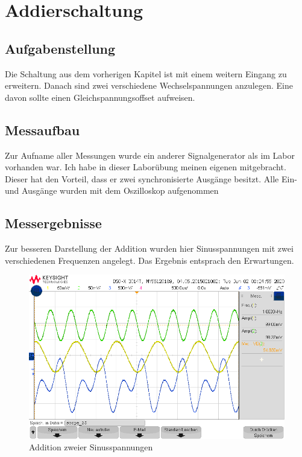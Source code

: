 \section{Addierschaltung}
\subsection{Aufgabenstellung}
Die Schaltung aus dem vorherigen Kapitel ist mit einem weitern Eingang zu erweitern. Danach sind zwei verschiedene Wechselspannungen anzulegen. Eine davon sollte einen Gleichspannungsoffset aufweisen. 


\subsection{Messaufbau}
Zur Aufname aller Messungen wurde ein anderer Signalgenerator als im Labor vorhanden war. Ich habe in dieser Laborübung meinen eigenen mitgebracht. Dieser hat den Vorteil, dass er zwei synchronisierte Ausgänge besitzt. Alle Ein- und Ausgänge wurden mit dem Oszilloskop aufgenommen


\subsection{Messergebnisse}
Zur besseren Darstellung der Addition wurden hier Sinusspannungen mit zwei verschiedenen Frequenzen angelegt. Das Ergebnis entsprach den Erwartungen. 
\begin{figure}[H]
    \centering
    \includegraphics[width=\costumPicWidth]{Lab_1/Messungen/Addierer/scope_25.png}
    \caption{Addition zweier Sinusspannungen}
    \label{fig:Addierschaltung_Ergebnis}
\end{figure}

